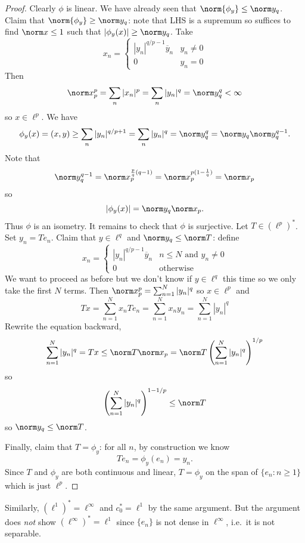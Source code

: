 \documentclass[a4paper]{article}
\begin{document}
\begin{proof}
  Clearly \(\phi\) is linear. We have already seen that \(\norm{\phi_y} \leq \norm y_q\). Claim that \(\norm{\phi_y} \geq \norm y_q\): note that LHS is a supremum so suffices to find \(\norm x \leq 1\) such that \(|\phi_y(x)| \geq \norm y_q\). Take
  \[
    x_n =
    \begin{cases}
      |y_n|^{q/p - 1} \overline y_n & y_n \neq 0 \\
      0 & y_n = 0
    \end{cases}
  \]
  Then
  \[
    \norm x_p^p = \sum_n |x_n|^p = \sum_n |y_n|^q = \norm y_q^q < \infty
  \]
  so \(x \in \ell^p\). We have
  \[
    \phi_y(x) = (x, y) \geq \sum_{n} |y_n|^{q/p + 1} = \sum_n |y_n|^q = \norm y_q^q = \norm y_q \norm y_q^{q - 1}.
  \]
  Note that
  \[
    \norm y_q^{q - 1} = \norm x_p^{\frac{p}{q}(q - 1)} = \norm x_p^{p (1 - \frac{1}{q})} = \norm x_p
  \]
  so
  \[
    |\phi_y(x)| = \norm y_q \norm x_p.
  \]
  Thus \(\phi\) is an isometry. It remains to check that \(\phi\) is surjective. Let \(T \in (\ell^p)^*\). Set \(y_n = Te_n\). Claim that \(y \in \ell^q\) and \(\norm y_q \leq \norm T\): define
  \[
    x_n =
    \begin{cases}
      |y_n|^{q/p - 1} \overline y_n & n \leq N \text{ and } y_n \neq 0 \\
      0 & \text{otherwise}
    \end{cases}
  \]
  We want to proceed as before but we don't know if \(y \in \ell^q\) this time so we only take the first \(N\) terms. Then \(\norm x_p^p = \sum_{n = 1}^N |y_n|^q\) so \(x \in \ell^p\) and
  \[
     Tx
    = \sum_{n = 1}^N x_n Te_n
    = \sum_{n = 1}^N x_n y_n
    = \sum_{n = 1}^N |y_n|^q
  \]
  Rewrite the equation backward,
  \[
    \sum_{n = 1}^N |y_n|^q
    = Tx
    \leq \norm T \norm x_p
    = \norm T \left( \sum_{n = 1}^N |y_n|^q \right)^{1/p}
  \]
  so
  \[
    \left( \sum_{n = 1}^N |y_n|^q \right)^{1 - 1/p} \leq \norm T
  \]
  so \(\norm y_q \leq \norm T\).

  Finally, claim that \(T = \phi_y\): for all \(n\), by construction we know
  \[
    Te_n = \phi_y(e_n) = y_n.
  \]
  Since \(T\) and \(\phi_y\) are both continuous and linear, \(T = \phi_y\) on the span of \(\{e_n: n \geq 1\}\) which is just \(\ell^p\).
\end{proof}

\begin{remark}
  Similarly, \((\ell^1)^* = \ell^\infty\) and \(c_0^* = \ell^1\) by the same argument. But the argument does \emph{not} show \((\ell^\infty)^* = \ell^1\) since \(\{e_n\}\) is not dense in \(\ell^\infty\), i.e.\ it is not separable.
\end{remark}
\end{document}
